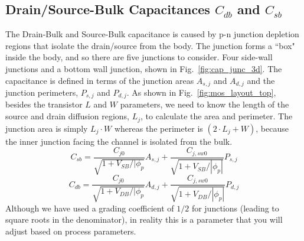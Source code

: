 \subsection{Drain/Source-Bulk Capacitances $C_{db}$ and $C_{sb}$}

The Drain-Bulk and Source-Bulk capacitance is caused by p-n junction depletion regions that isolate the drain/source from the body. The junction forms a ``box" inside the body, and so there are five junctions to consider. Four side-wall junctions and a bottom wall junction, shown in Fig.~\ref{fig:cap_junc_3d}.  The capacitance is defined in terms of the junction areas $A_{s,j}$ and $A_{d,j}$ and the junction perimeters, $P_{s,j}$ and $P_{d,j}$.  As shown in  Fig.~\ref{fig:mos_layout_top}, besides the transistor $L$ and $W$ parameters, we need to know the length of the source and drain diffusion regions, $L_j$, to calculate the area and perimeter.  The junction area is simply $L_j \cdot W$ whereas the perimeter is $(2\cdot L_j + W)$, because the inner junction facing the channel is isolated from the bulk.
% 
\begin{equation}
   C_{sb} = \frac{C_{j0}}{\sqrt{ 1 + V_{SB}/|\phi_{p}}}  A_{s,j} + \frac{C_{j,sw0}}{\sqrt{ 1 + V_{SB}/|\phi_p|}} P_{s,j}
\end{equation}
%
\begin{equation}
   C_{db} = \frac{C_{j0}}{\sqrt{ 1 + V_{DB}/|\phi_{p}}}  A_{d,j} + \frac{C_{j,sw0}}{\sqrt{ 1 + V_{DB}/|\phi_p|}} P_{d,j}
\end{equation}
%
Although we have used a grading coefficient of $1/2$ for junctions (leading to square roots in the denominator), in reality this is a parameter that you will adjust based on process parameters.

